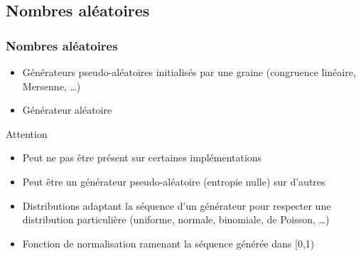 \documentclass[C++.tex]{subfiles}
\begin{document}
\subsection*{Nombres aléatoires}
\begin{frame}[fragile]
	\frametitle{Nombres aléatoires}
	\begin{itemize}
		\item Générateurs pseudo-aléatoires initialisés par une graine (congruence linéaire, Mersenne, \ldots)
		\item Générateur aléatoire
	\end{itemize}

	\begin{alertblock}{Attention}
		\begin{itemize}
			\item Peut ne pas être présent sur certaines implémentations
			\item Peut être un générateur pseudo-aléatoire (entropie nulle) sur d'autres
		\end{itemize}
	\end{alertblock}

	\begin{itemize}
		\item Distributions adaptant la séquence d'un générateur pour respecter une distribution particulière (uniforme, normale, binomiale, de Poisson, \ldots)
		\item Fonction de normalisation ramenant la séquence générée dans [0,1)
	\end{itemize}
\end{frame}
\end{document}
